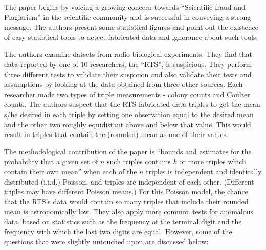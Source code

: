 \documentclass{article}
\begin{document}
The paper begins by voicing a growing concern towards ``Scientific fraud
and Plagiarism'' in the scientific community and is successful in
conveying a strong message.
The authors present some statistical figures and point out the existence of easy statistical tools to detect fabricated data and ignorance about such tools.

The authors examine datsets from radio-biological experiments. They find that data reported by one of 10 researchers, the ``RTS'', is suspicious.
They perform three different tests to validate their suspicion and also validate their tests and assumptions by looking at the data obtained from three other sources.
Each researcher made two types of triple measurements - colony counts and Coulter counts.
The authors suspect that the RTS fabricated data triples to get the mean s/he desired in each triple by setting one observation equal to the desired mean and the other two roughly equidistant above and below that value.
This would result in triples that contain the (rounded) mean as one of their values.

The methodological contribution of the paper is “bounds and estimates for the probability that a given set of $n$ such triples contains $k$ or more triples which contain their own mean” when each of the $n$ triples is independent and identically distributed (i.i.d.) Poisson, and triples are independent of each other.
(Different triples may have different Poisson means.)
For this Poisson model, the chance that the RTS's data would contain so many triples that include their rounded mean is astronomically low.
They also apply more common tests for anomalous data, based on statistics such as the frequency of the terminal digit and the frequency with which the last two digits are equal.
However, some of the questions that were slightly untouched upon are discussed below:
\end{document}
